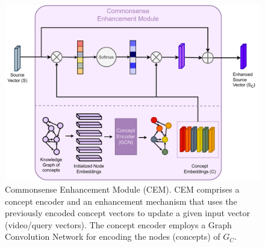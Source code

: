 \begin{figure}[t!]
    \centering
    \includegraphics[width=0.8\linewidth]{figures/figure_files/Cem.pdf}
    \caption{\modelname Commonsense Enhancement Module (CEM). CEM comprises a concept encoder and an enhancement mechanism that uses the previously encoded concept vectors to update a given input vector (video/query vectors). The concept encoder employs a Graph Convolution Network for encoding the nodes (concepts) of \(G_C\). 
    }
  \label{fig:cem}
\end{figure}
